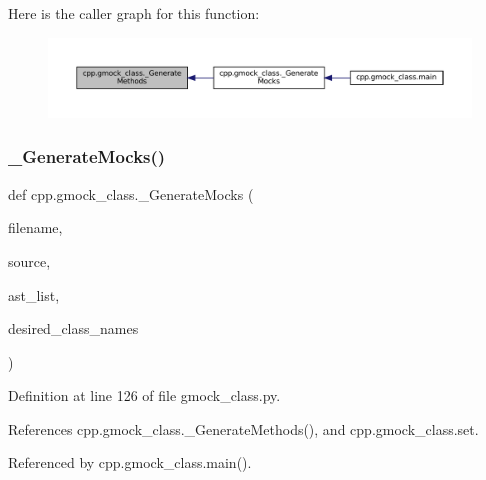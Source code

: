 Here is the caller graph for this function\+:
\nopagebreak
\begin{figure}[H]
\begin{center}
\leavevmode
\includegraphics[width=350pt]{namespacecpp_1_1gmock__class_ae1b91676e6a4c7ae21c3ef2394a096a1_icgraph}
\end{center}
\end{figure}
\mbox{\label{namespacecpp_1_1gmock__class_a3f8d5ceabb0bd6143422efeccc900ca9}} 
\subsubsection{\texorpdfstring{\+\_\+\+Generate\+Mocks()}{\_GenerateMocks()}}
{\footnotesize\ttfamily def cpp.\+gmock\+\_\+class.\+\_\+\+Generate\+Mocks (\begin{DoxyParamCaption}\item[{}]{filename,  }\item[{}]{source,  }\item[{}]{ast\+\_\+list,  }\item[{}]{desired\+\_\+class\+\_\+names }\end{DoxyParamCaption})\hspace{0.3cm}{\ttfamily [private]}}



Definition at line 126 of file gmock\+\_\+class.\+py.



References cpp.\+gmock\+\_\+class.\+\_\+\+Generate\+Methods(), and cpp.\+gmock\+\_\+class.\+set.



Referenced by cpp.\+gmock\+\_\+class.\+main().


